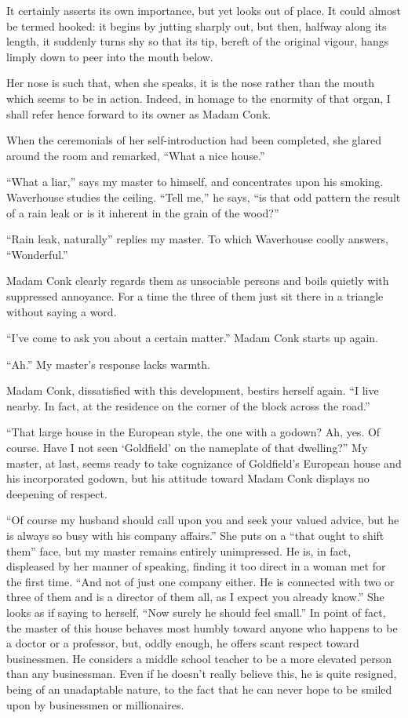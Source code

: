 \documentclass[12pt, openright]{book}
\begin{document}
It certainly asserts its own importance, but yet looks out of place. It
could almost be termed hooked: it begins by jutting sharply out, but
then, halfway along its length, it suddenly turns shy so that its tip,
bereft of the original vigour, hangs limply down to peer into the mouth
below.

Her nose is such that, when she speaks, it is the nose rather than the
mouth which seems to be in action. Indeed, in homage to the enormity of
that organ, I shall refer hence forward to its owner as Madam Conk.

When the ceremonials of her self-introduction had been completed, she
glared around the room and remarked, ``What a nice house.''

``What a liar,'' says my master to himself, and concentrates upon his
smoking. Waverhouse studies the ceiling. ``Tell me,'' he says, ``is that
odd pattern the result of a rain leak or is it inherent in the grain of
the wood?''

``Rain leak, naturally'' replies my master. To which Waverhouse coolly
answers, ``Wonderful.''

Madam Conk clearly regards them as unsociable persons and boils quietly
with suppressed annoyance. For a time the three of them just sit there
in a triangle without saying a word.

``I've come to ask you about a certain matter.'' Madam Conk starts up
again.

``Ah.'' My master's response lacks warmth.

Madam Conk, dissatisfied with this development, bestirs herself again.
``I live nearby. In fact, at the residence on the corner of the block
across the road.''

``That large house in the European style, the one with a godown? Ah,
yes. Of course. Have I not seen `Goldfield' on the nameplate of that
dwelling?'' My master, at last, seems ready to take cognizance of
Goldfield's European house and his incorporated godown, but his attitude
toward Madam Conk displays no deepening of respect.

``Of course my husband should call upon you and seek your valued advice,
but he is always so busy with his company affairs.'' She puts on a
``that ought to shift them'' face, but my master remains entirely
unimpressed. He is, in fact, displeased by her manner of speaking,
finding it too direct in a woman met for the first time. ``And not of
just one company either. He is connected with two or three of them and
is a director of them all, as I expect you already know.'' She looks as
if saying to herself, ``Now surely he should feel small.'' In point of
fact, the master of this house behaves most humbly toward anyone who
happens to be a doctor or a professor, but, oddly enough, he offers
scant respect toward businessmen. He considers a middle school teacher
to be a more elevated person than any businessman. Even if he doesn't
really believe this, he is quite resigned, being of an unadaptable
nature, to the fact that he can never hope to be smiled upon by
businessmen or millionaires.
\end{document}
